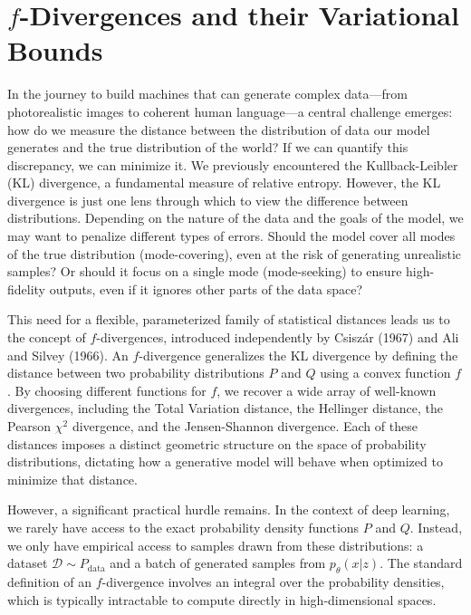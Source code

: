 \chapter{$f$-Divergences and their Variational Bounds}
\label{ch:f_divergence}

In the journey to build machines that can generate complex data---from photorealistic images to coherent human language---a central challenge emerges: how do we measure the distance between the distribution of data our model generates and the true distribution of the world? If we can quantify this discrepancy, we can minimize it. We previously encountered the Kullback-Leibler (KL) divergence, a fundamental measure of relative entropy. However, the KL divergence is just one lens through which to view the difference between distributions. Depending on the nature of the data and the goals of the model, we may want to penalize different types of errors. Should the model cover all modes of the true distribution (mode-covering), even at the risk of generating unrealistic samples? Or should it focus on a single mode (mode-seeking) to ensure high-fidelity outputs, even if it ignores other parts of the data space?

This need for a flexible, parameterized family of statistical distances leads us to the concept of $f$-divergences, introduced independently by Csisz\'{a}r (1967) and Ali and Silvey (1966). An $f$-divergence generalizes the KL divergence by defining the distance between two probability distributions $P$ and $Q$ using a convex function $f$. By choosing different functions for $f$, we recover a wide array of well-known divergences, including the Total Variation distance, the Hellinger distance, the Pearson $\chi^2$ divergence, and the Jensen-Shannon divergence. Each of these distances imposes a distinct geometric structure on the space of probability distributions, dictating how a generative model will behave when optimized to minimize that distance.

However, a significant practical hurdle remains. In the context of deep learning, we rarely have access to the exact probability density functions $P$ and $Q$. Instead, we only have empirical access to samples drawn from these distributions: a dataset $\mathcal{D} \sim P_{\text{data}}$ and a batch of generated samples from $p_\theta(x|z)$. The standard definition of an $f$-divergence involves an integral over the probability densities, which is typically intractable to compute directly in high-dimensional spaces. 

